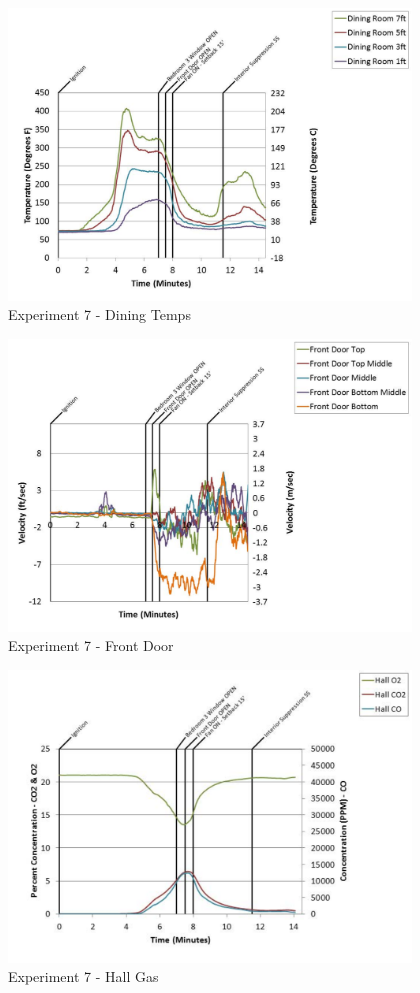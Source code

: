 \documentclass{article}
\begin{document}
\begin{appendices}
	\clearpage

	\begin{figure}[h!]
		\centering
		\includegraphics[height=3.05in]{0_Images/Results_Charts/Exp_7_Charts/DiningTemps.pdf}
		\caption{Experiment 7 - Dining Temps}
	\end{figure}
 

	\begin{figure}[h!]
		\centering
		\includegraphics[height=3.05in]{0_Images/Results_Charts/Exp_7_Charts/FrontDoor.pdf}
		\caption{Experiment 7 - Front Door}
	\end{figure}
 
	\clearpage

	\begin{figure}[h!]
		\centering
		\includegraphics[height=3.05in]{0_Images/Results_Charts/Exp_7_Charts/HallGas.pdf}
		\caption{Experiment 7 - Hall Gas}
	\end{figure}
 


\end{appendices}
\end{document}

